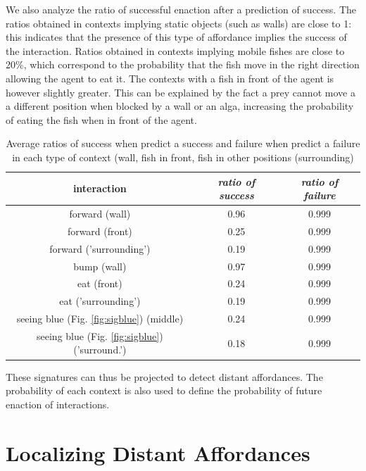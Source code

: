 \documentclass[conference]{IEEEtran}
\begin{document}
We also analyze the ratio of successful enaction after a prediction of success. The ratios obtained in contexts implying static objects (such as walls) are close to 1: this indicates that the presence of this type of affordance implies the success of the interaction. Ratios obtained in contexts implying mobile fishes are close to 20\%, which correspond to the probability that the fish move in the right direction allowing the agent to eat it. The contexts with a fish in front of the agent is however slightly greater. This can be explained by the fact a prey cannot move a a different position when blocked by a wall or an alga, increasing the probability of eating the fish when in front of the agent.


\begin{table}[htbp]
\caption{Average ratios of success when predict a success and failure when predict a failure in each type of context (wall, fish in front, fish in other positions (surrounding)}
\begin{center}
\begin{tabular}{|c|c|c|}
\hline 
\textbf{interaction} & \textbf{\textit{ratio of success}}& \textbf{\textit{ratio of failure}} \\
\hline
forward (wall)& 0.96 &  0.999 \\
\hline
forward (front)& 0.25& 0.999 \\
\hline
forward ('surrounding')& 0.19 & 0.999 \\
\hline
bump (wall)& 0.97 & 0.999 \\
\hline
eat (front)& 0.24 & 0.999 \\
\hline
eat ('surrounding')& 0.19 & 0.999 \\
\hline
seeing blue (Fig. \ref{fig:sigblue}) (middle)& 0.24 & 0.999 \\
\hline
seeing blue (Fig. \ref{fig:sigblue}) ('surround.')& 0.18 & 0.999 \\
\hline
\end{tabular}
\label{tab1}
\end{center}
\end{table}

These signatures can thus be projected to detect distant affordances. The probability of each context is also used to define the probability of future enaction of interactions.



\section{Localizing Distant Affordances}
\end{document}

